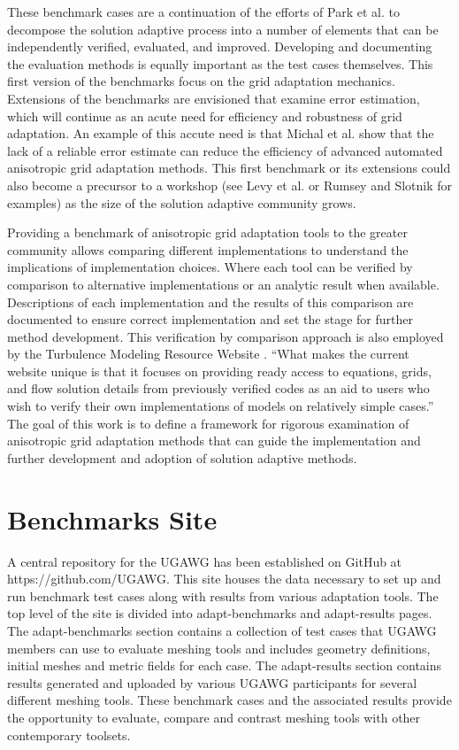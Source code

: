 \documentclass[3p,times,procedia,number]{elsarticle}
\begin{document}
These benchmark cases are a continuation of the efforts of
Park et al. \cite{park-loseille-krakos-michal-adapt-decomposition}
to decompose the solution adaptive process into a number of
elements that can be independently verified, evaluated, and improved.
Developing and documenting the evaluation methods is equally important
as the test cases themselves.
This first version of the benchmarks focus on the grid adaptation
mechanics.
Extensions of the benchmarks are envisioned that examine error
estimation, which will continue as an acute need for
efficiency and robustness of grid adaptation.
An example of this accute need is that
Michal et al. \cite{michal-unstruct-adapt-epic-dpw6} show that
the lack of a reliable error estimate can reduce the efficiency of advanced
automated anisotropic grid adaptation methods.
This first benchmark or its extensions could also become a
precursor to a workshop (see Levy et al. \cite{dpw5-summary} or
Rumsey and Slotnik \cite{rumsey-slotnick-summary-highliftpw2} for examples)
as the size of the solution adaptive community grows.

Providing a benchmark
of anisotropic grid adaptation tools
to the greater community
allows comparing different implementations
to understand the implications of implementation choices.
Where each tool can be verified
by comparison to alternative implementations or
an analytic result when available.
Descriptions of each implementation and the
results of this comparison are documented to ensure correct implementation
and set the stage for further method development.
This verification by comparison approach is also employed by the
Turbulence Modeling Resource Website \cite{rumsey-smith-huang-turbmodels-description}.
``What makes the current website unique is that it focuses on
providing ready access to equations, grids, and flow solution details
from previously verified codes as an aid to users
who wish to verify their own implementations of models on
relatively simple cases.''\cite{rumsey-smith-huang-turbmodels-description}
The goal of this work is to define a framework for
rigorous examination of anisotropic grid adaptation methods
that can guide the implementation and
further development and adoption of solution adaptive methods.

\section{Benchmarks Site}

A central repository for the UGAWG has been established on GitHub at https://github.com/UGAWG.   This site houses the data necessary to set up and run benchmark test cases along with results from various adaptation tools.  The top level of the site is divided into adapt-benchmarks and adapt-results pages.  The adapt-benchmarks section contains a collection of test cases that UGAWG members can use to evaluate meshing tools and includes geometry definitions, initial meshes and metric fields for each case.  The adapt-results section contains results generated and uploaded by various UGAWG participants for several different meshing tools.  These benchmark cases and the associated results provide the opportunity to evaluate, compare and contrast meshing tools with other contemporary toolsets.
\end{document}

